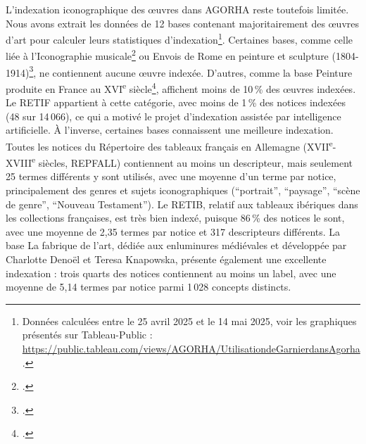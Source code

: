 L’indexation iconographique des œuvres dans AGORHA reste toutefois limitée. Nous avons extrait les données de 12 bases contenant majoritairement des œuvres d’art pour calculer leurs statistiques d’indexation\footnote{Données calculées entre le 25 avril 2025 et le 14 mai 2025, voir les graphiques présentés sur Tableau-Public : \url{https://public.tableau.com/views/AGORHA/UtilisationdeGarnierdansAgorha}.}. Certaines bases, comme celle liée à l’Iconographie musicale\footcite{institutnationaldhistoiredelartIconographieMusicaleRepertoire} ou Envois de Rome en peinture et sculpture (1804-1914)\footcite{institutnationaldhistoiredelartEnvoisRomePeinture}, ne contiennent aucune œuvre indexée. D’autres, comme la base Peinture produite en France au XVI\textsuperscript{e} siècle\footcite{institutnationaldhistoiredelartRecensementPeintureProduite}, affichent moins de 10 \% des œuvres indexées. Le RETIF appartient à cette catégorie, avec moins de 1 \% des notices indexées (48 sur 14 066), ce qui a motivé le projet d’indexation assistée par intelligence artificielle. À l’inverse, certaines bases connaissent une meilleure indexation. Toutes les notices du Répertoire des tableaux français en Allemagne (XVII\textsuperscript{e}-XVIII\textsuperscript{e} siècles, REPFALL) contiennent au moins un descripteur, mais seulement 25 termes différents y sont utilisés, avec une moyenne d’un terme par notice, principalement des genres et sujets iconographiques (“portrait”, “paysage”, “scène de genre”, “Nouveau Testament”). Le RETIB, relatif aux tableaux ibériques dans les collections françaises, est très bien indexé, puisque 86 \% des notices le sont, avec une moyenne de 2,35 termes par notice et 317 descripteurs différents. La base La fabrique de l’art, dédiée aux enluminures médiévales et développée par Charlotte Denoël et Teresa Knapowska, présente également une excellente indexation : trois quarts des notices contiennent au moins un label, avec une moyenne de 5,14 termes par notice parmi 1 028 concepts distincts.

